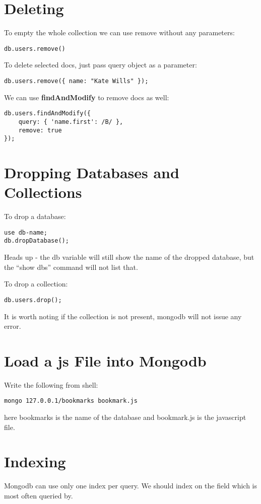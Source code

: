 \documentclass[a4paper, 12pt]{article}
\begin{document}
\section{Deleting}
To empty the whole collection we can use remove without any parameters:
\begin{verbatim}
db.users.remove()
\end{verbatim}
To delete selected docs, just pass query object as a parameter:
\begin{verbatim}
db.users.remove({ name: "Kate Wills" });
\end{verbatim}
We can use \textbf{findAndModify} to remove docs as well:
\begin{verbatim}
db.users.findAndModify({
    query: { 'name.first': /B/ },
    remove: true
});
\end{verbatim}

\section{Dropping Databases and Collections}
To drop a database:
\begin{verbatim}
use db-name;
db.dropDatabase();
\end{verbatim}
Heads up - the db variable will still show the name of the dropped database, but the ``show dbs'' command will not list that.

To drop a collection:
\begin{verbatim}
db.users.drop();
\end{verbatim}
It is worth noting if the collection is not present, mongodb will not issue any error.

\section{Load a js File into Mongodb}
Write the following from shell:
\begin{verbatim}
mongo 127.0.0.1/bookmarks bookmark.js
\end{verbatim}
here bookmarks is the name of the database and bookmark.js is the javascript file.

\section{Indexing}
Mongodb can use only one index per query. We should index on the field which is most often queried by.
\end{document}
